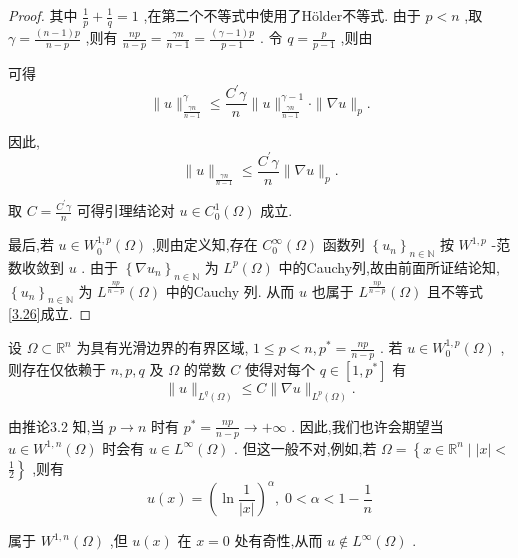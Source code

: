 \documentclass[lang=cn,newtx,10pt,scheme=chinese,thmcnt=chapter]{elegantbook}
\begin{document}
\begin{proof}
其中 \(\frac{1}{p} + \frac{1}{q} = 1\) ,在第二个不等式中使用了Hölder不等式.
由于 \(p < n\) ,取 \(\gamma  = \frac{\left( {n - 1}\right) p}{n - p}\) ,则有 \(\frac{np}{n - p} = \frac{\gamma n}{n - 1} = \frac{\left( {\gamma  - 1}\right) p}{p - 1}\) . 令 \(q = \frac{p}{p - 1}\) ,则由

可得
\begin{equation*}
\parallel u{\parallel }_{\frac{\gamma n}{n - 1}}^{\gamma } \leqslant  \frac{{C}^{\prime }\gamma }{n}\parallel u{\parallel }_{\frac{\gamma n}{n - 1}}^{\gamma  - 1} \cdot  \parallel \nabla u{\parallel }_{p}.
\end{equation*}

因此,
\begin{equation*}
\parallel u{\parallel }_{\frac{\gamma n}{n - 1}} \leqslant  \frac{{C}^{\prime }\gamma }{n}\parallel \nabla u{\parallel }_{p}.
\end{equation*}

取 \(C = \frac{{C}^{\prime }\gamma }{n}\) 可得引理结论对 \(u \in  {C}_{0}^{1}\left( \Omega \right)\) 成立.

最后,若 \(u \in  {W}_{0}^{1,p}\left( \Omega \right)\) ,则由定义知,存在 \({C}_{0}^{\infty }\left( \Omega \right)\) 函数列 \({\left\{  {u}_{n}\right\}  }_{n \in  \mathbb{N}}\) 按 \({W}^{1,p}\) -范数收敛到 \(u\) . 由于 \({\left\{  \nabla {u}_{n}\right\}  }_{n \in  \mathbb{N}}\) 为 \({L}^{p}\left( \Omega \right)\) 中的Cauchy列,故由前面所证结论知, \({\left\{  {u}_{n}\right\}  }_{n \in  \mathbb{N}}\) 为 \({L}^{\frac{np}{n - p}}\left( \Omega \right)\) 中的Cauchy 列. 从而 \(u\) 也属于 \({L}^{\frac{np}{n - p}}\left( \Omega \right)\) 且不等式\ref{3.26}成立.
\end{proof}
\begin{corollary}
    设 \(\Omega  \subset  {\mathbb{R}}^{n}\) 为具有光滑边界的有界区域, \(1 \leqslant  p < n,{p}^{ * } = \frac{np}{n - p}\) . 若 \(u \in  {W}_{0}^{1,p}\left( \Omega \right)\) ,则存在仅依赖于 \(n,p,q\) 及 \(\Omega\) 的常数 \(C\) 使得对每个 \(q \in  \left\lbrack  {1,{p}^{ * }}\right\rbrack\) 有
\begin{equation*}
\parallel u{\parallel }_{{L}^{q}\left( \Omega \right) } \leqslant  C\parallel \nabla u{\parallel }_{{L}^{p}\left( \Omega \right) }.
\end{equation*}

\end{corollary}
\begin{note}
    由推论3.2 知,当 \(p \rightarrow  n\) 时有 \({p}^{ * } = \frac{np}{n - p} \rightarrow   + \infty\) . 因此,我们也许会期望当 \(u \in  {W}^{1,n}\left( \Omega \right)\) 时会有 \(u \in  {L}^{\infty }\left( \Omega \right)\) . 但这一般不对,例如,若 \(\Omega  = \left\{  {x \in  {\mathbb{R}}^{n} \mid  \left| x\right|  < }\right.\)  \(\left. \frac{1}{2}\right\}\) ,则有
\begin{equation*}
u\left( x\right)  = {\left( \ln \frac{1}{\left| x\right| }\right) }^{\alpha },\;0 < \alpha  < 1 - \frac{1}{n}
\end{equation*}

属于 \({W}^{1,n}\left( \Omega \right)\) ,但 \(u\left( x\right)\) 在 \(x = 0\) 处有奇性,从而 \(u \notin  {L}^{\infty }\left( \Omega \right)\) .

\end{note}
\end{document}
